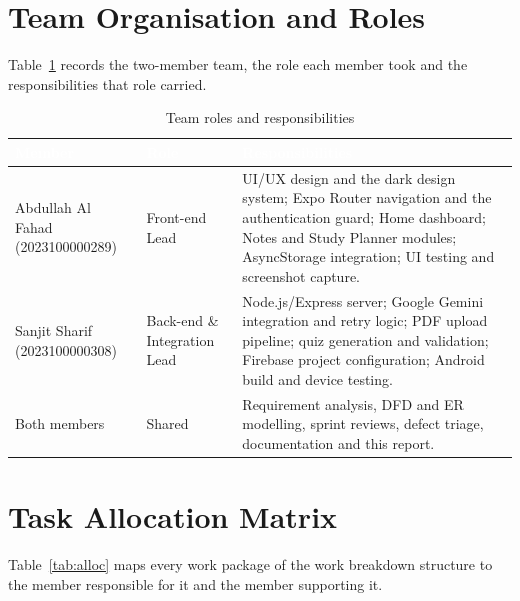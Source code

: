 \documentclass[12pt,a4paper,oneside]{report}
\begin{document}
\section{Team Organisation and Roles}

Table~\ref{tab:roles} records the two-member team, the role each member took and the responsibilities that role carried.

\begin{table}[H]
\centering
\caption{Team roles and responsibilities}
\label{tab:roles}
\small
\begin{tabularx}{\textwidth}{@{}p{4.0cm}p{2.6cm}X@{}}
\toprule
\rowcolor{tblhead} \textcolor{white}{\textbf{Member}} &
\textcolor{white}{\textbf{Role}} &
\textcolor{white}{\textbf{Responsibilities}} \\
\midrule
Abdullah Al Fahad (2023100000289) & Front-end Lead & UI/UX design and the dark
  design system; Expo Router navigation and the authentication guard; Home
  dashboard; Notes and Study Planner modules; AsyncStorage integration; UI testing
  and screenshot capture. \\
Sanjit Sharif (2023100000308) & Back-end \& Integration Lead & Node.js/Express
  server; Google Gemini integration and retry logic; PDF upload pipeline; quiz
  generation and validation; Firebase project configuration; Android build and
  device testing. \\
Both members & Shared & Requirement analysis, DFD and ER modelling, sprint reviews,
  defect triage, documentation and this report. \\
\bottomrule
\end{tabularx}
\end{table}

\section{Task Allocation Matrix}

Table~\ref{tab:alloc} maps every work package of the work breakdown structure to the member responsible for it and the member supporting it.
\end{document}
